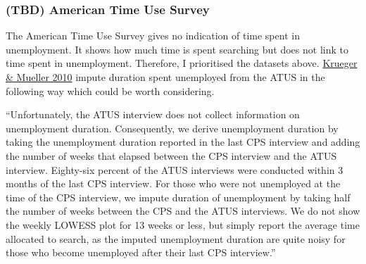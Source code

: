 \subsubsection{(TBD) American Time Use
Survey}\label{tbd-american-time-use-survey}

The American Time Use Survey gives no indication of time spent in
unemployment. It shows how much time is spent searching but does not
link to time spent in unemployment. Therefore, I prioritised the
datasets above.
\href{https://www.sciencedirect.com/science/article/abs/pii/S0047272709001625}{Krueger
\& Mueller 2010} impute duration spent unemployed from the ATUS in the
following way which could be worth considering.

``Unfortunately, the ATUS interview does not collect information on
unemployment duration. Consequently, we derive unemployment duration by
taking the unemployment duration reported in the last CPS interview and
adding the number of weeks that elapsed between the CPS interview and
the ATUS interview. Eighty-six percent of the ATUS interviews were
conducted within 3 months of the last CPS interview. For those who were
not unemployed at the time of the CPS interview, we impute duration of
unemployment by taking half the number of weeks between the CPS and the
ATUS interviews. We do not show the weekly LOWESS plot for 13 weeks or
less, but simply report the average time allocated to search, as the
imputed unemployment duration are quite noisy for those who become
unemployed after their last CPS interview.''
